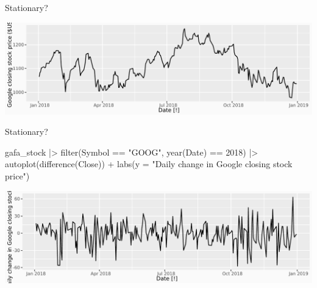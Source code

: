 \documentclass[
  14pt,
  ignorenonframetext,
  aspectratio=169,
]{beamer}
\newenvironment{Shaded}{\begin{snugshade}}{\end{snugshade}}
\newcommand{\AttributeTok}[1]{\textcolor[rgb]{0.77,0.63,0.00}{#1}}
\newcommand{\DecValTok}[1]{\textcolor[rgb]{0.00,0.00,0.81}{#1}}
\newcommand{\FunctionTok}[1]{\textcolor[rgb]{0.00,0.00,0.00}{#1}}
\newcommand{\NormalTok}[1]{\textcolor[rgb]{0.00,0.00,0.00}{#1}}
\newcommand{\SpecialCharTok}[1]{\textcolor[rgb]{0.00,0.00,0.00}{#1}}
\newcommand{\StringTok}[1]{\textcolor[rgb]{0.31,0.60,0.02}{#1}}
\renewenvironment{Shaded}{\vspace*{0.15cm}\color{black}\fontsize{10}{10}\sf\begin{snugshade}\color{black}}{\end{snugshade}}
\begin{document}
\begin{frame}[fragile]{Stationary?}
\protect\hypertarget{stationary}{}
\fontsize{11}{12}\sf

\begin{Shaded}
\end{Shaded}

\includegraphics{04_arima_files/figure-beamer/unnamed-chunk-2-1.pdf}
\end{frame}

\begin{frame}[fragile]{Stationary?}
\protect\hypertarget{stationary-1}{}
\fontsize{11}{12}\sf

\begin{Shaded}
\begin{Highlighting}[]
\NormalTok{gafa\_stock }\SpecialCharTok{|\textgreater{}}
  \FunctionTok{filter}\NormalTok{(Symbol }\SpecialCharTok{==} \StringTok{"GOOG"}\NormalTok{, }\FunctionTok{year}\NormalTok{(Date) }\SpecialCharTok{==} \DecValTok{2018}\NormalTok{) }\SpecialCharTok{|\textgreater{}}
  \FunctionTok{autoplot}\NormalTok{(}\FunctionTok{difference}\NormalTok{(Close)) }\SpecialCharTok{+}
  \FunctionTok{labs}\NormalTok{(}\AttributeTok{y =} \StringTok{"Daily change in Google closing stock price"}\NormalTok{)}
\end{Highlighting}
\end{Shaded}

\includegraphics{04_arima_files/figure-beamer/unnamed-chunk-3-1.pdf}
\end{frame}
\end{document}
